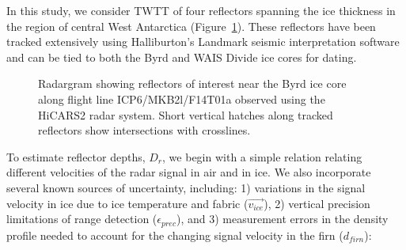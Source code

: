 In this study, we consider TWTT of four reflectors spanning the ice thickness in the region of central West Antarctica (Figure~\ref{fig:layergram}). These reflectors have been tracked extensively using Halliburton's Landmark seismic interpretation software and can be tied to both the Byrd and WAIS Divide ice cores for dating. %

\begin{figure}[h]\label{fig:layergram}
\centering
{}
\caption{Radargram showing reflectors of interest near the Byrd ice core along flight line ICP6/MKB2l/F14T01a observed using the HiCARS2 radar system. Short vertical hatches along tracked reflectors show intersections with crosslines.}
\end{figure}


To estimate reflector depths, $D_r$, we begin with a simple relation relating different velocities of the radar signal in air and in ice. We also incorporate several known sources of uncertainty, including: 1) variations in the signal velocity in ice due to ice temperature and fabric ($\vec{v_{ice}}$), 2) vertical precision limitations of range detection ($\epsilon_{prec}$), and 3) measurement errors in the density profile needed to account for the changing signal velocity in the firn ($d_{firn}$):

